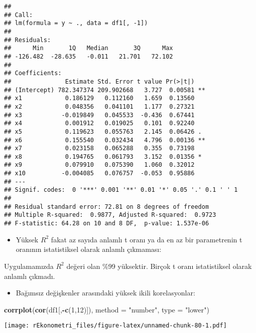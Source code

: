 \documentclass[
]{book}
\newenvironment{Shaded}{\begin{snugshade}}{\end{snugshade}}
\newcommand{\DataTypeTok}[1]{\textcolor[rgb]{0.13,0.29,0.53}{#1}}
\newcommand{\DecValTok}[1]{\textcolor[rgb]{0.00,0.00,0.81}{#1}}
\newcommand{\KeywordTok}[1]{\textcolor[rgb]{0.13,0.29,0.53}{\textbf{#1}}}
\newcommand{\NormalTok}[1]{#1}
\newcommand{\OperatorTok}[1]{\textcolor[rgb]{0.81,0.36,0.00}{\textbf{#1}}}
\newcommand{\StringTok}[1]{\textcolor[rgb]{0.31,0.60,0.02}{#1}}
\providecommand{\tightlist}{%
  \setlength{\itemsep}{0pt}\setlength{\parskip}{0pt}}
\begin{document}
\begin{verbatim}
## 
## Call:
## lm(formula = y ~ ., data = df1[, -1])
## 
## Residuals:
##      Min       1Q   Median       3Q      Max 
## -126.482  -28.635   -0.011   21.701   72.102 
## 
## Coefficients:
##               Estimate Std. Error t value Pr(>|t|)   
## (Intercept) 782.347374 209.902668   3.727  0.00581 **
## x1            0.186129   0.112160   1.659  0.13560   
## x2            0.048356   0.041101   1.177  0.27321   
## x3           -0.019849   0.045533  -0.436  0.67441   
## x4            0.001912   0.019025   0.101  0.92240   
## x5            0.119623   0.055763   2.145  0.06426 . 
## x6            0.155540   0.032434   4.796  0.00136 **
## x7            0.023158   0.065288   0.355  0.73198   
## x8            0.194765   0.061793   3.152  0.01356 * 
## x9            0.079910   0.075390   1.060  0.32012   
## x10          -0.004085   0.076757  -0.053  0.95886   
## ---
## Signif. codes:  0 '***' 0.001 '**' 0.01 '*' 0.05 '.' 0.1 ' ' 1
## 
## Residual standard error: 72.81 on 8 degrees of freedom
## Multiple R-squared:  0.9877, Adjusted R-squared:  0.9723 
## F-statistic: 64.28 on 10 and 8 DF,  p-value: 1.537e-06
\end{verbatim}

\begin{itemize}
\tightlist
\item
  Yüksek \(R^2\) fakat az sayıda anlamlı t oranı ya da en az bir parametrenin t oranının istatistiksel olarak anlamlı çıkmaması:
\end{itemize}

Uygulamamızda \(R^2\) değeri olan \%99 yüksektir. Birçok t oranı istatistiksel olarak anlamlı çıkmadı.

\begin{itemize}
\tightlist
\item
  Bağımsız değişkenler arasındaki yüksek ikili korelasyonlar:
\end{itemize}

\begin{Shaded}
\begin{Highlighting}[]
\KeywordTok{corrplot}\NormalTok{(}\KeywordTok{cor}\NormalTok{(df1[,}\OperatorTok{-}\KeywordTok{c}\NormalTok{(}\DecValTok{1}\NormalTok{,}\DecValTok{12}\NormalTok{)]), }\DataTypeTok{method =} \StringTok{"number"}\NormalTok{, }\DataTypeTok{type =} \StringTok{"lower"}\NormalTok{)}
\end{Highlighting}
\end{Shaded}

\texttt{[image: rEkonometri\_files/figure-latex/unnamed-chunk-80-1.pdf]}
\end{document}
